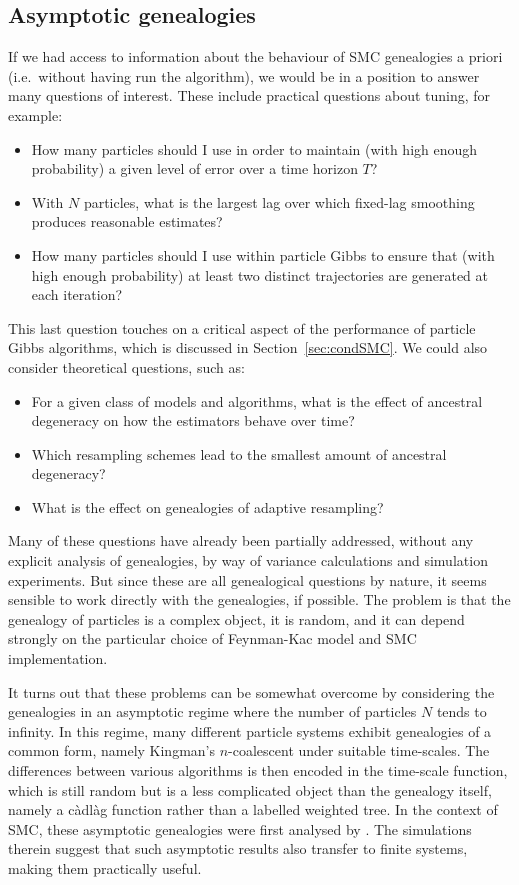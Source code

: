 \subsection{Asymptotic genealogies}
If we had access to information about the behaviour of SMC genealogies a priori (i.e.\ without having run the algorithm), we would be in a position to answer many questions of interest. These include practical questions about tuning, for example:
\begin{itemize}
\item How many particles should I use in order to maintain (with high enough probability) a given level of error over a time horizon $T$?
\item With $N$ particles, what is the largest lag over which fixed-lag smoothing produces reasonable estimates?
\item How many particles should I use within particle Gibbs to ensure that (with high enough probability) at least two distinct trajectories are generated at each iteration?
\end{itemize}
This last question touches on a critical aspect of the performance of particle Gibbs algorithms, which is discussed in Section~\ref{sec:condSMC}.
We could also consider theoretical questions, such as:
\begin{itemize}
\item For a given class of models and algorithms, what is the effect of ancestral degeneracy on how the estimators behave over time?
\item Which resampling schemes lead to the smallest amount of ancestral degeneracy?
\item What is the effect on genealogies of adaptive resampling?
\end{itemize}
Many of these questions have already been partially addressed, without any explicit analysis of genealogies, by way of variance calculations and simulation experiments.
But since these are all genealogical questions by nature, it seems sensible to work directly with the genealogies, if possible.
The problem is that the genealogy of particles is a complex object, it is random, and it can depend strongly on the particular choice of Feynman-Kac model and SMC implementation.

It turns out that these problems can be somewhat overcome by considering the genealogies in an asymptotic regime where the number of particles $N$ tends to infinity.
In this regime, many different particle systems exhibit genealogies of a common form, namely Kingman's $n$-coalescent under suitable time-scales. The differences between various algorithms is then encoded in the time-scale function, which is still random but is a less complicated object than the genealogy itself, namely a c\`adl\`ag function rather than a labelled weighted tree.
In the context of SMC, these asymptotic genealogies were first analysed by \textcite{koskela2018}. The simulations therein suggest that such asymptotic results also transfer to finite systems, making them practically useful.

